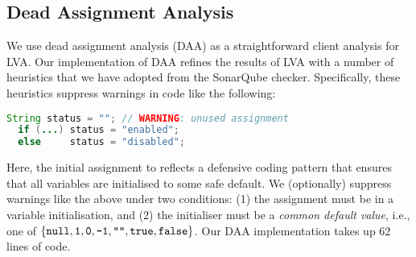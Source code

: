 \subsection{Dead Assignment Analysis}\label{sec:daa}
We use dead assignment analysis (DAA) as a straightforward client analysis for LVA.
Our implementation of DAA refines the results of LVA with a number of heuristics that we have
adopted from the SonarQube checker.  Specifically, these heuristics suppress warnings in code like the following:
\begin{lstlisting}[language=java]
  String status = ""; // WARNING: unused assignment
  if (...) status = "enabled";
  else     status = "disabled";
\end{lstlisting}
Here, the initial assignment to  reflects a defensive coding pattern
that ensures that all variables are initialised to some safe default.
We (optionally) suppress warnings like the above under two conditions:
(1) the assignment must be in a variable initialisation, and (2)
the initialiser must be a \emph{common default value}, i.e., one of
$\{ \code{null}, \code{1}, \code{0}, \code{-1}, \code{""}, \code{true}, \code{false} \}$.
Our DAA implementation takes up 62 lines of code.

